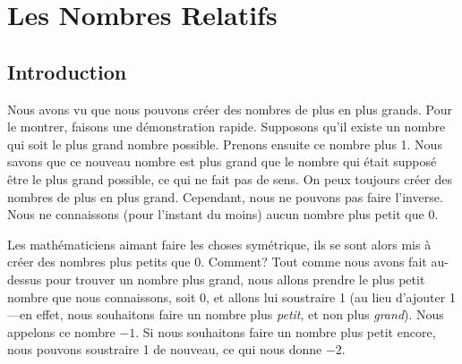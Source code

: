 \chapter{Les Nombres Relatifs}


\section{Introduction}

Nous avons vu que nous pouvons créer des nombres de plus en plus grands. Pour le montrer, faisons une démonstration rapide. Supposons qu'il existe un nombre qui soit le plus grand nombre possible. Prenons ensuite ce nombre plus 1. Nous savons que ce nouveau nombre est plus grand que le nombre qui était supposé être le plus grand possible, ce qui ne fait pas de sens. On peux toujours créer des nombres de plus en plus grand. Cependant, nous ne pouvons pas faire l'inverse. Nous ne connaissons (pour l'instant du moins) aucun nombre plus petit que 0.

\begin{center}
\end{center}

\noindent Les mathématiciens aimant faire les choses symétrique, ils se sont alors mis à créer des nombres plus petits que 0. Comment? Tout comme nous avons fait au-dessus pour trouver un nombre plus grand, nous allons prendre le plus petit nombre que nous connaissons, soit 0, et allons lui soustraire 1 (au lieu d'ajouter 1---en effet, nous souhaitons faire un nombre plus {\em petit}, et non plus {\em grand}). Nous appelons ce nombre $-1$. Si nous souhaitons faire un nombre plus petit encore, nous pouvons soustraire 1 de nouveau, ce qui nous donne $-2$.

\begin{center}
\end{center}

